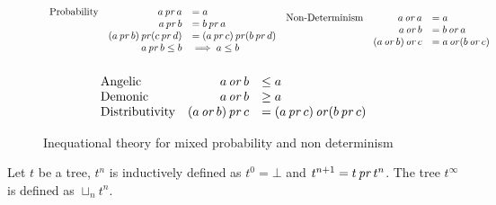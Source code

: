 \begin{figure}[h!]
    \begin{equation*}
        \begin{array}{lrl}
            \text{Probability} & a \operatorname{\mathit{pr}} a &= a \\
                        & a \operatorname{\mathit{pr}} b &= b \operatorname{\mathit{pr}} a \\
                        & (a \operatorname{\mathit{pr}} b) \operatorname{\mathit{pr}} (c \operatorname{\mathit{pr}} d) &= (a \operatorname{\mathit{pr}} c) \operatorname{\mathit{pr}} (b \operatorname{\mathit{pr}} d) \\
                        & a \operatorname{\mathit{pr}} b \leq b &\implies a \leq b  \\
            \\
        \end{array}
        \begin{array}{lrl}
            \text{Non-Determinism} & a \operatorname{\mathit{or}} a &= a \\
                        & a \operatorname{\mathit{or}} b &= b \operatorname{\mathit{or}} a \\
                        & (a \operatorname{\mathit{or}} b) \operatorname{\mathit{or}} c &= a \operatorname{\mathit{or}} (b \operatorname{\mathit{or}} c) \\
            \\
        \end{array}
    \end{equation*}
    \begin{equation*}
        \begin{array}{lrl}

            \text{Angelic} & a \operatorname{\mathit{or}} b &\leq a \\ 
            \text{Demonic} & a \operatorname{\mathit{or}} b &\geq a \\ 
            \text{Distributivity}
            & (a \operatorname{\mathit{or}} b) \operatorname{\mathit{pr}} c &= (a \operatorname{\mathit{pr}} c) \operatorname{\mathit{or}} (b \operatorname{\mathit{pr}} c)
        \end{array}
    \end{equation*}
    \caption{Inequational theory for mixed probability and non
    determinism}
    \label{fig:axiomsmixed}
\end{figure}




\begin{definition}
    \label{def:probaApproxConstruct}
    Let $t$ be a tree, $t^n$ is inductively defined as 
    $t^0 = \bot$ and $t^{n+1} = t \operatorname{\mathit{pr}} t^n$. The
    tree $t^\infty$ is defined as $\sqcup_n t^n$.
\end{definition}

